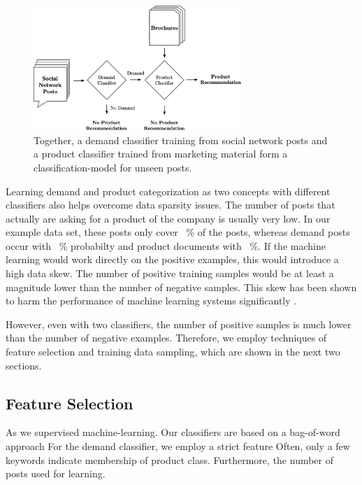 \begin{figure}
	\label{fig:workflow}
	\begin{center}
		\includegraphics[width=0.7\textwidth]{figures/nto_workflow.eps}
	\end{center}
	\caption{Together, a demand classifier training from social network posts and a product classifier trained from marketing material form a classification-model for unseen posts.}
\end{figure}

Learning demand and product categorization as two concepts with different classifiers also helps overcome data sparsity issues.
The number of posts that actually are asking for a product of the company is usually very low.
In our example data set, these posts only cover ~\% of the posts, whereas demand posts occur with ~\% probabilty and product documents with ~\%.
If the machine learning would work directly on the positive examples, this would introduce a high data skew.
The number of positive training samples would be at least a magnitude lower than the number of negative samples.
This skew has been shown to harm the performance of machine learning systems significantly \cite{monard2002learning, guo2008class}.

However, even with two classifiers, the number of positive samples is much lower than the number of negative examples.
Therefore, we employ techniques of feature selection and training data sampling, which are shown in the next two sections.

\subsection{Feature Selection}
As we supervised machine-learning.
Our classifiers are based on a bag-of-word approach \cite{yang1997comparative}
For the demand classifier, we employ a strict feature 
Often, only a few keywords indicate membership of product class.
Furthermore, the number of posts used for learning.


